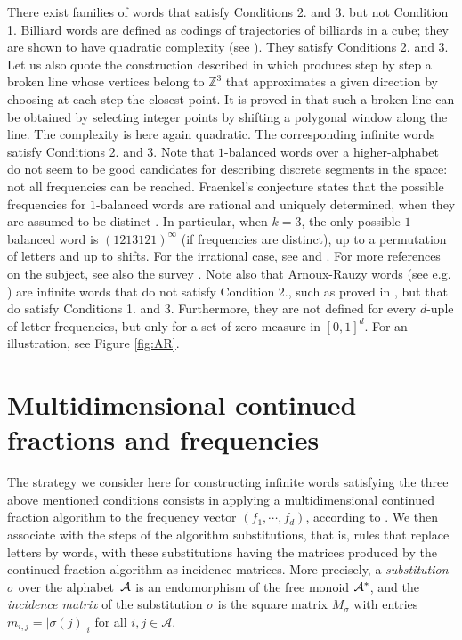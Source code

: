 \documentclass[preliminary,copyright,creativecommons]{eptcs}
\begin{document}
There exist families of words  that   satisfy  Conditions 2. and  3.    but not Condition 1. Billiard words   are defined as codings of  trajectories of billiards in a cube;
they  are shown to have quadratic complexity  (see   \cite{amst1,Baryshnikov:1995}).  They satisfy  Conditions 2. and  3. Let us also  quote   the construction   described in  \cite{Chevallier:09}   which produces step by step a broken line whose vertices  belong to
  $\mathbb{Z}^3$ that approximates a given  direction  by choosing at each step the  closest point. It is proved
  in  \cite{Chevallier:09} that such a  broken line can be  obtained by selecting  integer points   by shifting a polygonal
  window  along the line.  The complexity is here again quadratic.      The corresponding infinite words  satisfy  Conditions 2. and  3. 
  Note that  $1$-balanced words over a higher-alphabet do not seem to be   good candidates
for   describing   discrete segments in the space: not all frequencies can be reached.  Fraenkel's conjecture states  that    the  possible  frequencies   for  $1$-balanced  words   are rational  and uniquely determined, when  they are assumed   to be   distinct \cite{Fra73}. In particular,
when $k=3$, the only possible  $1$-balanced  word is $(1213121)^{\infty}$ (if frequencies are distinct),
up to a permutation of letters  and up to shifts.  For the irrational case, see \cite{Hub00} and \cite{Graham}.  For more references on the subject, see also   the survey \cite{Vui}.
Note also  that Arnoux-Rauzy    words  (see e.g. \cite{arnrau91,CFZ,CFM})  are 
infinite words   that do not satisfy Condition  2.,  such as proved  in  \cite{CFZ}, but that do  satisfy Conditions 1. and 3.  Furthermore,
they are not defined for every $d$-uple of letter frequencies, but     only for a set of zero measure in $[0,1]^d$.  For an illustration, see Figure \ref{fig:AR}.
\section{Multidimensional continued fractions and frequencies}
  
  The strategy we consider here     for   constructing  infinite words satisfying  the three  above mentioned conditions  consists in   applying a multidimensional continued fraction algorithm to the
  frequency vector $(f_1, \cdots,f_d)$, according to \cite{BLab}.  We then   associate  with the steps of the algorithm substitutions, that is, rules that  replace 
letters by words,   with these substitutions having   the  matrices   produced by the continued fraction algorithm   as incidence matrices. More precisely,
 a {\em substitution} $\sigma$ over the   alphabet~${\cal A}$ is an endomorphism of the free monoid
${\cal A}^*$, and the  {\em incidence matrix}  of the substitution $\sigma$ is the square matrix $M_{\sigma} $ with entries  $m_{i,j} = | \sigma(j)|_i$ for all $i,j  \in {\mathcal A}$.
\end{document}
